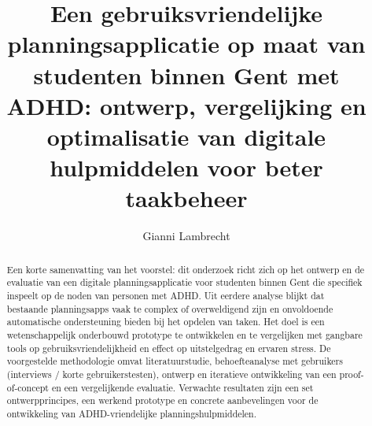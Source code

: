 \documentclass{hogent-article}
\title{Een gebruiksvriendelijke planningsapplicatie op maat van studenten binnen Gent met ADHD: ontwerp, vergelijking en optimalisatie van digitale hulpmiddelen voor beter taakbeheer}
\author{Gianni Lambrecht}
\begin{document}
\begin{abstract}
Een korte samenvatting van het voorstel: dit onderzoek richt zich op het ontwerp en de evaluatie van een digitale planningsapplicatie voor studenten binnen Gent die specifiek inspeelt op de noden van personen met ADHD. Uit eerdere analyse blijkt dat bestaande planningsapps vaak te complex of overweldigend zijn en onvoldoende automatische ondersteuning bieden bij het opdelen van taken. Het doel is een wetenschappelijk onderbouwd prototype te ontwikkelen en te vergelijken met gangbare tools op gebruiksvriendelijkheid en effect op uitstelgedrag en ervaren stress. De voorgestelde methodologie omvat literatuurstudie, behoefteanalyse met gebruikers (interviews / korte gebruikerstesten), ontwerp en iteratieve ontwikkeling van een proof-of-concept en een vergelijkende evaluatie. Verwachte resultaten zijn een set ontwerpprincipes, een werkend prototype en concrete aanbevelingen voor de ontwikkeling van ADHD-vriendelijke planningshulpmiddelen.
\end{abstract}

\tableofcontents



\printbibliography[heading=bibintoc]
\end{document}
